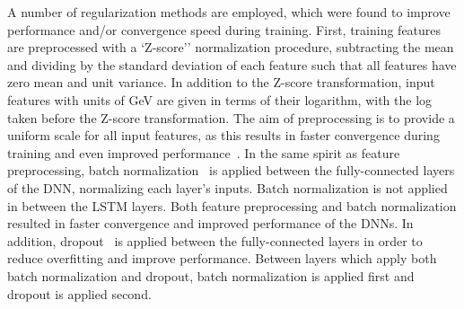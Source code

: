 A number of regularization methods are employed, which were found to improve performance and/or convergence speed during training.
First, training features are preprocessed with a `Z-score'' normalization procedure, subtracting the mean and dividing by the standard deviation of each feature such that all features have zero mean and unit variance.
In addition to the Z-score transformation, input features with units of GeV are given in terms of their logarithm, with the log taken before the Z-score transformation.
The aim of preprocessing is to provide a uniform scale for all input features, as this results in faster convergence during training and even improved performance~\cite{lecun_efficient_backprop}.
In the same spirit as feature preprocessing, batch normalization~\cite{ioffe2015batch} is applied between the fully-connected layers of the DNN, normalizing each layer's inputs.
Batch normalization is not applied in between the LSTM layers.
Both feature preprocessing and batch normalization resulted in faster convergence and improved performance of the DNNs.
In addition, dropout~\cite{dropout} is applied between the fully-connected layers in order to reduce overfitting and improve performance.
Between layers which apply both batch normalization and dropout, batch normalization is applied first and dropout is applied second.

